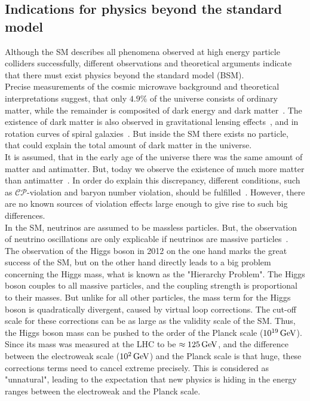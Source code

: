 \subsection{Indications for physics beyond the standard model}\label{sec:SM_bsm}
Although the SM describes all phenomena observed at high energy particle colliders successfully, different observations and theoretical arguments indicate that there must exist physics beyond the standard model (BSM).\\
Precise measurements of the cosmic microwave background and theoretical interpretations suggest, that only $4.9\%$ of the universe consists of ordinary matter, while the remainder is composited of dark energy and dark matter~\cite{DarkMatterPlanck}. The existence of dark matter is also observed in gravitational lensing effects~\cite{DarkMatterLensing}, and in rotation curves of spiral galaxies~\cite{DarkMatterRotation}. But inside the SM there exists no particle, that could explain the total amount of dark matter in the universe.\\
It is assumed, that in the early age of the universe there was the same amount of matter and antimatter. But, today we observe the existence of much more matter than antimatter~\cite{Antimatter,AsymSM}. In order do explain this discrepancy, different conditions, such as $\mathcal{CP}$-violation and baryon number violation, should be fulfilled~\cite{Sakharov}. However, there are no known sources of violation effects large enough to give rise to such big differences.\\
In the SM, neutrinos are assumed to be massless particles. But, the observation of neutrino oscillations are only explicable if neutrinos are massive particles~\cite{NeutrinoMass,PDG}.\\
The observation of the Higgs boson in 2012 on the one hand marks the great success of the SM, but on the other hand directly leads to a big problem concerning the Higgs mass, what is known as the "Hierarchy Problem". The Higgs boson couples to all massive particles, and the coupling strength is proportional to their masses. But unlike for all other particles, the mass term for the Higgs boson is quadratically divergent, caused by virtual loop corrections. The cut-off scale for these corrections can be as large as the validity scale of the SM. Thus, the Higgs boson mass can be pushed to the order of the Planck scale ($10^{19}\,\text{Ge\hspace{-.08em}V}$). Since its mass was measured at the LHC to be $\approx 125\,\text{Ge\hspace{-.08em}V}$, and the difference between the electroweak scale ($10^2\,\text{Ge\hspace{-.08em}V}$) and the Planck scale is that huge, these corrections terms need to cancel extreme precisely. This is considered as "unnatural", leading to the expectation that new physics is hiding in the energy ranges between the electroweak and the Planck scale.\\
